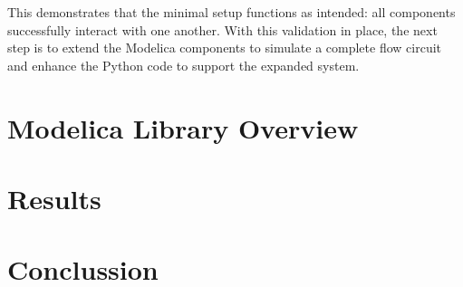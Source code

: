 \documentclass[we,final,11pt,oneside,openany]{uantwerpenbamathesis}
\begin{document}
This demonstrates that the minimal setup functions as intended: all components successfully interact with one another.
With this validation in place, the next step is to extend the Modelica components to simulate a complete flow circuit and enhance the Python code to support the expanded system.


\chapter{Modelica Library Overview}
\label{ch:modelica-library-overview}


\chapter{Results}
\label{ch:results}

\chapter{Conclussion}
\label{ch:conclussion}

\appendix



\end{document}
